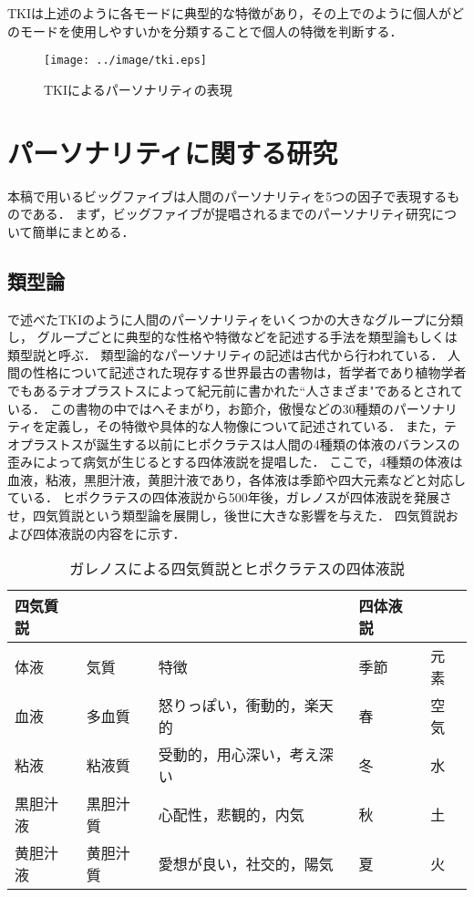 TKIは上述のように各モードに典型的な特徴があり，その上でのように個人がどのモードを使用しやすいかを分類することで個人の特徴を判断する．
\begin{figure}[tb]
    \centering
    \texttt{[image: ../image/tki.eps]}
    \caption{TKIによるパーソナリティの表現}
    \label{fig:tki}
\end{figure}

\section{パーソナリティに関する研究}
\label{sec:personality}
本稿で用いるビッグファイブは人間のパーソナリティを5つの因子で表現するものである．
まず，ビッグファイブが提唱されるまでのパーソナリティ研究について簡単にまとめる\cite{big5-history, psychology, first-personality,daniel}．

\subsection{類型論}
で述べたTKIのように人間のパーソナリティをいくつかの大きなグループに分類し，
グループごとに典型的な性格や特徴などを記述する手法を類型論もしくは類型説と呼ぶ．
類型論的なパーソナリティの記述は古代から行われている．
人間の性格について記述された現存する世界最古の書物は，哲学者であり植物学者でもあるテオプラストスによって紀元前に書かれた``人さまざま"であるとされている．
この書物の中ではへそまがり，お節介，傲慢などの30種類のパーソナリティを定義し，その特徴や具体的な人物像について記述されている\cite{theophrastus}．
また，テオプラストスが誕生する以前にヒポクラテスは人間の4種類の体液のバランスの歪みによって病気が生じるとする四体液説を提唱した\cite{hippocrates}．
ここで，4種類の体液は血液，粘液，黒胆汁液，黄胆汁液であり，各体液は季節や四大元素などと対応している．
ヒポクラテスの四体液説から500年後，ガレノスが四体液説を発展させ，四気質説という類型論を展開し，後世に大きな影響を与えた\cite{smith}．
四気質説および四体液説の内容をに示す．

\begin{table}[tb]
    \centering
    \caption[ガレノスによる四気質説とヒポクラテスの四体液説]{ガレノスによる四気質説とヒポクラテスの四体液説 \protect \footnotemark}
    \begin{tabular}{lllll} \toprule
        四気質説 & & & 四体液説 & \\ \midrule
        体液 & 気質 & 特徴 & 季節 & 元素\\ \midrule
        血液 & 多血質 & 怒りっぽい，衝動的，楽天的 & 春 & 空気 \\
        粘液 & 粘液質 & 受動的，用心深い，考え深い & 冬 & 水 \\
        黒胆汁液 & 黒胆汁質 & 心配性，悲観的，内気 & 秋 & 土 \\
        黄胆汁液 & 黄胆汁質 & 愛想が良い，社交的，陽気 & 夏 & 火 \\ \bottomrule
    \end{tabular}
    \label{tab:galenos}
\end{table}

